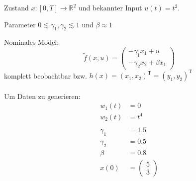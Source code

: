 \documentclass[12pt,a4paper,oneside]{article}
\begin{document}
Zustand $x:[0,T] \to \mathbb{R}^2$ und bekannter Input $u(t) = t^2$.

Parameter $0 \lesssim \gamma_1,\gamma_2 \lesssim 1$ und $\beta \approx 1$

Nominales Model:
\begin{equation*}
\tilde{f}(x,u) = \begin{pmatrix}
- \gamma_1 x_1 + u \\
- \gamma_2 x_2 + \beta x_1 
\end{pmatrix}
\end{equation*}
komplett beobachtbar bzw. $h(x)=(x_1,x_2)^\text{T}=(y_1,y_2)^\text{T}$
\\\\
Um Daten zu generieren:
\begin{align*}
w_1 (t) &= 0 \\
w_2 (t) &= t^4\\
\\
\gamma_1 &= 1.5 \\
\gamma_2 &= 0.5 \\
\beta &= 0.8 \\
x(0) &= \begin{pmatrix} 5\\3 \end{pmatrix}
\end{align*}
\end{document}

